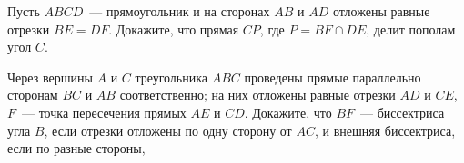 \documentclass{article}
\begin{document}
\begin{enumerate_boxed}
        \item Пусть $ABCD$~--- прямоугольник и на сторонах $AB$ и $AD$ отложены равные отрезки $BE = DF$.
        Докажите, что прямая $CP$, где $P = BF \cap DE$, делит пополам угол $C$.

        \item Через вершины $A$ и $C$ треугольника $ABC$ проведены прямые параллельно сторонам $BC$ и $AB$ соответственно; на них отложены равные отрезки $AD$ и $CE$, $F$~--- точка пересечения прямых $AE$ и $CD$.
        Докажите, что $BF$~--- биссектриса угла $B$, если отрезки отложены по одну сторону от $AC$, и внешняя биссектриса, если по разные стороны,
    \end{enumerate_boxed}
\end{document}
